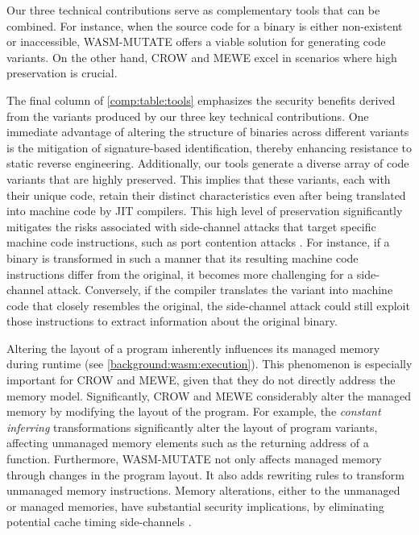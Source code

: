 \begin{tcolorbox}[title=Takeaway,boxrule=1pt,arc=.2em,boxsep=1.0mm]
    
    Our three technical contributions serve as complementary tools that can be combined.
    For instance, when the source code for a \Wasm binary is either non-existent or inaccessible, WASM-MUTATE offers a viable solution for generating code variants. 
    On the other hand, CROW and MEWE excel in scenarios where high preservation is crucial.
\end{tcolorbox}


\label{security_applications}

The final column of \autoref{comp:table:tools} emphasizes the security benefits derived from the variants produced by our three key technical contributions. 
One immediate advantage of altering the structure of \Wasm binaries across different variants is the mitigation of signature-based identification, thereby enhancing resistance to static reverse engineering.
Additionally, our tools generate a diverse array of code variants that are highly preserved. 
This implies that these variants, each with their unique \Wasm code, retain their distinct characteristics even after being translated into machine code by JIT compilers. 
This high level of preservation significantly mitigates the risks associated with side-channel attacks that target specific machine code instructions, such as port contention attacks \cite{10.1145/3488932.3517411}.
For instance, if a \Wasm binary is transformed in such a manner that its resulting machine code instructions differ from the original, it becomes more challenging for a side-channel attack. 
Conversely, if the compiler translates the variant into machine code that closely resembles the original, the side-channel attack could still exploit those instructions to extract information about the original \Wasm binary.

Altering the layout of a \Wasm program inherently influences its managed memory during runtime (see \autoref{background:wasm:execution}).
This phenomenon is especially important for CROW and MEWE, given that they do not directly address the \Wasm memory model.
Significantly, CROW and MEWE considerably alter the managed memory by modifying the layout of the \Wasm program.
For example, the \emph{constant inferring} transformations significantly alter the layout of program variants, affecting unmanaged memory elements such as the returning address of a function.
Furthermore, WASM-MUTATE not only affects managed memory through changes in the \Wasm program layout.
It also adds rewriting rules to transform unmanaged memory instructions.
Memory alterations, either to the unmanaged or managed memories, have substantial security implications, by eliminating potential cache timing side-channels \cite{Swivel}.


